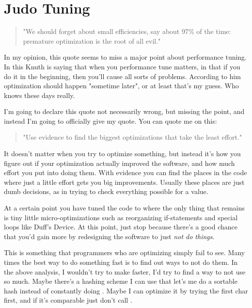 \section{Judo Tuning}

\begin{quote}
"We should forget about small efficiencies, say about 97\% of the time: premature optimization is the root of all evil."

\end{quote}

In my opinion, this quote seems to miss a major point about performance tuning.
In this Knuth is saying that when you performance tune matters, in that if you
do it in the beginning, then you'll cause all sorts of problems.  According to
him optimization should happen "sometime later", or at least that's my guess.
Who knows these days really.

I'm going to declare this quote not necessarily wrong, but missing the point,
and instead I'm going to officially give my quote.  You can quote me on this:

\begin{quote}
"Use evidence to find the biggest optimizations that take the least effort."

\end{quote}

It doesn't matter when you try to optimize something, but instead it's how
you figure out if your optimization actually improved the software, and 
how much effort you put into doing them.  With evidence you can find the
places in the code where just a little effort gets you big improvements.
Usually these places are just dumb decisions, as in  
trying to check everything possible for a  value.

At a certain point you have tuned the code to where the only thing that
remains is tiny little micro-optimizations such as reorganizing if-statements
and special loops like Duff's Device.  At this point, just stop because there's
a good chance that you'd gain more by redesigning the software to just 
\emph{not do things}.

This is something that programmers who are optimizing simply fail to see.
Many times the best way to do something fast is to find out ways to not
do them.  In the above analysis, I wouldn't try to make 
faster, I'd try to find a way to not use  so much.  Maybe
there's a hashing scheme I can use that let's me do a sortable hash instead
of constantly doing .  Maybe I can optimize it by trying
the first char first, and if it's comparable just don't call .


